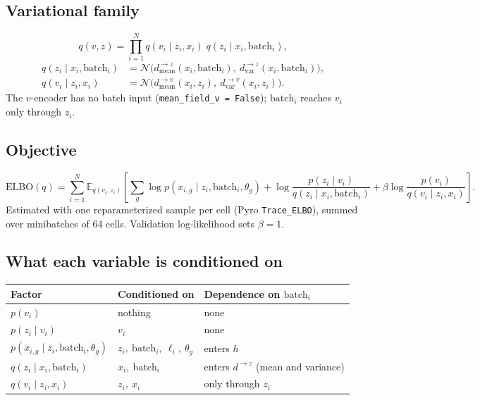 \documentclass{article}
\newcommand{\batch}{\mathrm{batch}}
\begin{document}
\subsection{Variational family}
\[
q(v, z) = \prod_{i=1}^{N} q(v_i \mid z_i, x_i)\; q(z_i \mid x_i, \batch_i),
\]
\begin{align*}
q(z_i \mid x_i, \batch_i) &= \mathcal{N}\big(d^{\to z}_{\mathrm{mean}}(x_i, \batch_i),\ d^{\to z}_{\mathrm{var}}(x_i, \batch_i)\big), \\
q(v_i \mid z_i, x_i) &= \mathcal{N}\big(d^{\to v}_{\mathrm{mean}}(x_i, z_i),\ d^{\to v}_{\mathrm{var}}(x_i, z_i)\big).
\end{align*}
The $v$-encoder has no batch input (\texttt{mean\_field\_v = False}); $\batch_i$ reaches $v_i$
only through $z_i$.

\subsection{Objective}
\[
\mathrm{ELBO}(q) = \sum_{i=1}^{N} \mathbb{E}_{q(v_i, z_i)}\!\left[
\sum_g \log p(x_{i,g} \mid z_i, \batch_i, \theta_g)
+ \log \frac{p(z_i \mid v_i)}{q(z_i \mid x_i, \batch_i)}
+ \beta \log \frac{p(v_i)}{q(v_i \mid z_i, x_i)}
\right].
\]
Estimated with one reparameterized sample per cell (Pyro \texttt{Trace\_ELBO}), summed over
minibatches of 64 cells. Validation log-likelihood sets $\beta = 1$.

\subsection{What each variable is conditioned on}
\begin{center}
\begin{tabular}{lll}
\toprule
Factor & Conditioned on & Dependence on $\batch_i$ \\
\midrule
$p(v_i)$ & nothing & none \\
$p(z_i \mid v_i)$ & $v_i$ & none \\
$p(x_{i,g} \mid z_i, \batch_i, \theta_g)$ & $z_i,\ \batch_i,\ \ell_i,\ \theta_g$ & enters $h$ \\
$q(z_i \mid x_i, \batch_i)$ & $x_i,\ \batch_i$ & enters $d^{\to z}$ (mean and variance) \\
$q(v_i \mid z_i, x_i)$ & $z_i,\ x_i$ & only through $z_i$ \\
\bottomrule
\end{tabular}
\end{center}
\end{document}
